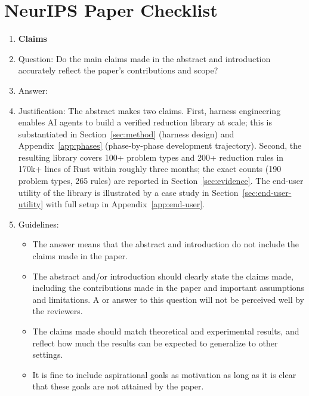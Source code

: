\section*{NeurIPS Paper Checklist}

\begin{enumerate}

\item {\bf Claims}
    \item[] Question: Do the main claims made in the abstract and introduction accurately reflect the paper's contributions and scope?
    \item[] Answer: \answerYes{}
    \item[] Justification: The abstract makes two claims. First, harness engineering enables AI agents to build a verified reduction library at scale; this is substantiated in Section~\ref{sec:method} (harness design) and Appendix~\ref{app:phases} (phase-by-phase development trajectory). Second, the resulting library covers 100+ problem types and 200+ reduction rules in 170k+ lines of Rust within roughly three months; the exact counts (190 problem types, 265 rules) are reported in Section~\ref{sec:evidence}. The end-user utility of the library is illustrated by a case study in Section~\ref{sec:end-user-utility} with full setup in Appendix~\ref{app:end-user}.
    \item[] Guidelines:
    \begin{itemize}
        \item The answer \answerNA{} means that the abstract and introduction do not include the claims made in the paper.
        \item The abstract and/or introduction should clearly state the claims made, including the contributions made in the paper and important assumptions and limitations. A \answerNo{} or \answerNA{} answer to this question will not be perceived well by the reviewers.
        \item The claims made should match theoretical and experimental results, and reflect how much the results can be expected to generalize to other settings.
        \item It is fine to include aspirational goals as motivation as long as it is clear that these goals are not attained by the paper.
    \end{itemize}


\end{enumerate}
